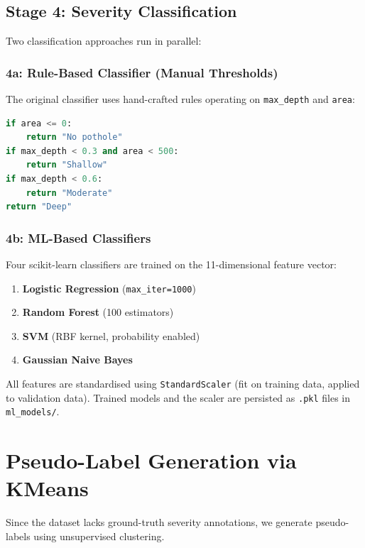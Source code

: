 \documentclass[12pt, a4paper]{article}
\begin{document}
\subsection{Stage 4: Severity Classification}
\label{subsec:classification}

Two classification approaches run in parallel:

\subsubsection{4a: Rule-Based Classifier (Manual Thresholds)}

The original classifier uses hand-crafted rules operating on \texttt{max\_depth} and \texttt{area}:

\begin{lstlisting}[language=Python]
if area <= 0:
    return "No pothole"
if max_depth < 0.3 and area < 500:
    return "Shallow"
if max_depth < 0.6:
    return "Moderate"
return "Deep"
\end{lstlisting}

\subsubsection{4b: ML-Based Classifiers}

Four scikit-learn classifiers are trained on the 11-dimensional feature vector:
\begin{enumerate}
    \item \textbf{Logistic Regression} (\texttt{max\_iter=1000})
    \item \textbf{Random Forest} (100 estimators)
    \item \textbf{SVM} (RBF kernel, probability enabled)
    \item \textbf{Gaussian Naive Bayes}
\end{enumerate}

All features are standardised using \texttt{StandardScaler} (fit on training data, applied to validation data). Trained models and the scaler are persisted as \texttt{.pkl} files in \texttt{ml\_models/}.

\section{Pseudo-Label Generation via KMeans}
\label{sec:kmeans}

Since the dataset lacks ground-truth severity annotations, we generate pseudo-labels using unsupervised clustering.
\end{document}

